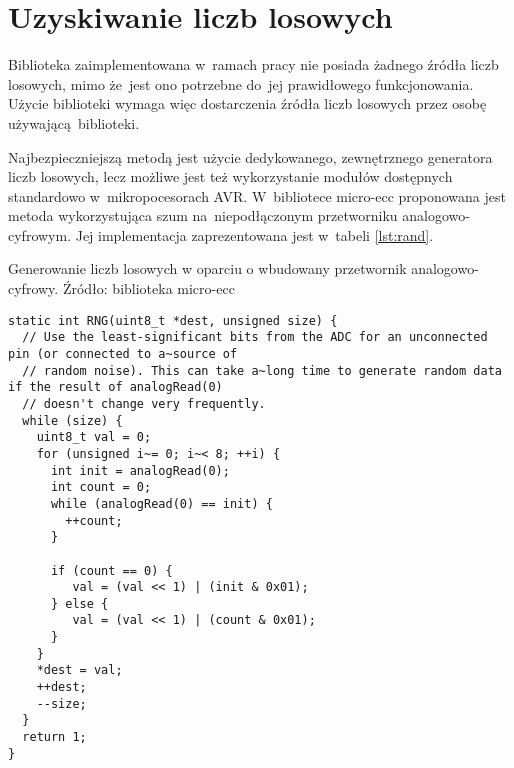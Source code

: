 \chapter{Uzyskiwanie liczb losowych}
\label{app:randgen}



Biblioteka zaimplementowana w~ramach pracy nie posiada żadnego źródła liczb losowych, mimo że~jest ono potrzebne do~jej prawidłowego funkcjonowania. Użycie biblioteki wymaga więc dostarczenia źródła liczb losowych przez osobę używającą biblioteki.

Najbezpieczniejszą metodą jest użycie dedykowanego, zewnętrznego generatora liczb losowych, lecz możliwe jest też wykorzystanie modułów dostępnych standardowo w~mikropocesorach AVR. W~bibliotece micro-ecc proponowana jest metoda wykorzystująca szum na~niepodłączonym przetworniku analogowo-cyfrowym. Jej implementacja zaprezentowana jest w~tabeli \ref{lst:rand}.

\begin{table}[!htb]
\caption{Generowanie liczb losowych w oparciu o wbudowany przetwornik analogowo-cyfrowy. Źródło: biblioteka micro-ecc}
\label{lst:rand}
\begin{lstlisting}
static int RNG(uint8_t *dest, unsigned size) {
  // Use the least-significant bits from the ADC for an unconnected pin (or connected to a~source of 
  // random noise). This can take a~long time to generate random data if the result of analogRead(0) 
  // doesn't change very frequently.
  while (size) {
    uint8_t val = 0;
    for (unsigned i~= 0; i~< 8; ++i) {
      int init = analogRead(0);
      int count = 0;
      while (analogRead(0) == init) {
        ++count;
      }
      
      if (count == 0) {
         val = (val << 1) | (init & 0x01);
      } else {
         val = (val << 1) | (count & 0x01);
      }
    }
    *dest = val;
    ++dest;
    --size;
  }
  return 1;
}
\end{lstlisting}
\end{table}
